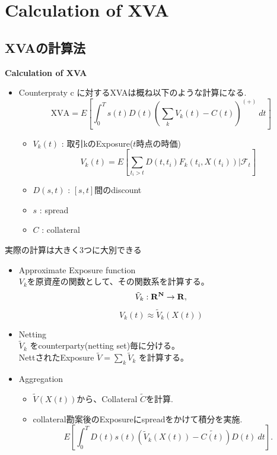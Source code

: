 \documentclass[driverfallback=dvipdfmx,cjk]{beamer}
\begin{document}
\section{Calculation of XVA} 
\subsection{XVAの計算法}
\begin{frame}
   \textbf{Calculation of XVA} 
\end{frame}

\begin{frame}
    \begin{itemize}
        \item Counterpraty c に対するXVAは概ね以下のような計算になる.
            $$ \text{XVA}=  E\left[\int_0^T s(t)D(t)\left(\sum_{k}V_k(t)- C(t)\right)^{(+)} \ dt\right] $$
            \begin{itemize}
                \item $V_k(t)$ : 取引kのExposure($t$時点の時価)
                    $$ V_k(t) = E\left[ \sum_{t_i > t} D(t, t_i) F_k(t_i, X(t_i)) | \mathcal{F}_t\right]$$
                \item $D(s,t)$ : $[s, t]$間のdiscount
                \item $s$ : spread 
                \item $C$ : collateral
            \end{itemize}
    \end{itemize}
\end{frame} 

\begin{frame}
    実際の計算は大きく3つに大別できる
    \begin{itemize}
        \item Approximate Exposure function \\
            $V_k$を原資産の関数として、その関数系を計算する。
            $$ \tilde{V}_k: \bf{R}^N \rightarrow \bf{R},$$
            $$V_k(t) \approx \tilde{V}_k(X(t))$$
        \item Netting\\
            $\tilde{V}_k$ をcounterparty(netting set)毎に分ける。\\
            NettされたExposure $\tilde{V}=\sum_{k} \tilde{V}_k$
            を計算する。
        \item Aggregation
            \begin{itemize}
                \item $\tilde{V}(X(t))$から、Collateral $\tilde{C}$を計算.
                \item collateral勘案後のExposureにspreadをかけて積分を実施.
                    $$ E\left[\int_0^T D(t)s(t) \left(\tilde{V}_k(X(t)) -\tilde{C(t)} \right) D(t)\ dt\right].$$
            \end{itemize}
    \end{itemize}
\end{frame}
\end{document}
